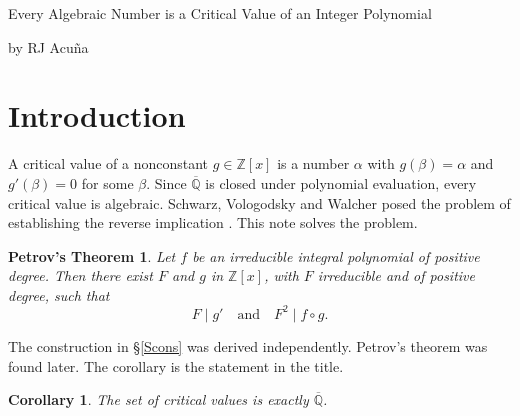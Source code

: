 \documentclass[10pt]{article}
\newcommand\Z{\mathbb{Z}}
\newcommand\Q{\mathbb{Q}}
\theoremstyle{plain}
\newtheorem*{ptheorem}{Petrov's Theorem}
\newtheorem{cor}{Corollary}
\theoremstyle{remark}
\theoremstyle{plain}
\begin{document}
\begin{center}
  {\Large \textsc Every Algebraic Number is a
    Critical Value of an Integer Polynomial}

  {by RJ Acu\~na}
\end{center}

\begin{center}
  \begin{minipage}{0.85\textwidth}
    \begin{abstract}
      \noindent
      \justifying
      We arrived at an independent proof of Petrov's theorem. For every
      irreducible $f \in \Z[x]$ of positive degree there are $g \in \Z[x]$
      and an irreducible $F \in \Z[x]$ of positive degree with
      $F \mid g'$ and $F^{2} \mid f \circ g$.
      Equivalently, every algebraic number is a critical value of an integer
      polynomial, so the set of critical values of $\Z[x]$ is exactly
      $\overline{\Q}$. The construction is explicit. We classify
      $g \in \Z[x]$ with critical value $\alpha$, and find a lower bound for
      $\deg g$. The proof was
      assisted by AI, and has been formalized in Lean.
    \end{abstract}
  \end{minipage}
\end{center}

\section{Introduction}

A critical value of a nonconstant $g \in \Z[x]$ is a number $\alpha$ with
$g(\beta) = \alpha$ and $g'(\beta) = 0$ for some $\beta$. Since $\overline{\Q}$ is
closed under polynomial evaluation, every critical value is algebraic.
Schwarz, Vologodsky and Walcher posed the problem of establishing the
reverse implication \cite{svw2017}.
This note solves the problem.

\begin{ptheorem}
  Let $f$ be an irreducible integral polynomial of positive degree. Then there
  exist $F$ and $g$ in $\Z[x]$, with $F$ irreducible and of positive degree,
  such that
  \[
    F \mid g' \quad\text{and}\quad F^{2} \mid f \circ g .
  \]
\end{ptheorem}

The construction in \S\ref{Scons} was derived independently. Petrov's theorem
\cite{petrov2021} was found later.
The corollary is the statement in the title.

\begin{cor}\label{C3}
  The set of critical values is exactly $\overline{\Q}$.
\end{cor}
\end{document}
